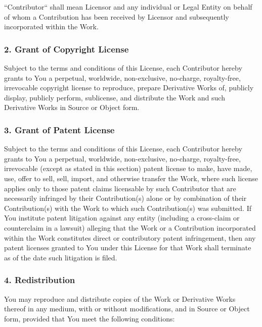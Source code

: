 \documentclass[a4paper, 11pt, twoside]{article}
\begin{document}
“Contributor“ shall mean Licensor and any individual or Legal Entity on behalf of whom a Contribution has been received by Licensor and subsequently incorporated within the Work.

\subsubsection{2. Grant of Copyright License}

Subject to the terms and conditions of this License, each Contributor hereby grants to You a perpetual, worldwide, non-exclusive, no-charge, royalty-free, irrevocable copyright license to reproduce, prepare Derivative Works of, publicly display, publicly perform, sublicense, and distribute the Work and such Derivative Works in Source or Object form.

\subsubsection{3. Grant of Patent License}

Subject to the terms and conditions of this License, each Contributor hereby grants to You a perpetual, worldwide, non-exclusive, no-charge, royalty-free, irrevocable (except as stated in this section) patent license to make, have made, use, offer to sell, sell, import, and otherwise transfer the Work, where such license applies only to those patent claims licensable by such Contributor that are necessarily infringed by their Contribution(s) alone or by combination of their Contribution(s) with the Work to which such Contribution(s) was submitted. If You institute patent litigation against any entity (including a cross-claim or counterclaim in a lawsuit) alleging that the Work or a Contribution incorporated within the Work constitutes direct or contributory patent infringement, then any patent licenses granted to You under this License for that Work shall terminate as of the date such litigation is filed.

\subsubsection{4. Redistribution}

You may reproduce and distribute copies of the Work or Derivative Works thereof in any medium, with or without modifications, and in Source or Object form, provided that You meet the following conditions:
\end{document}
